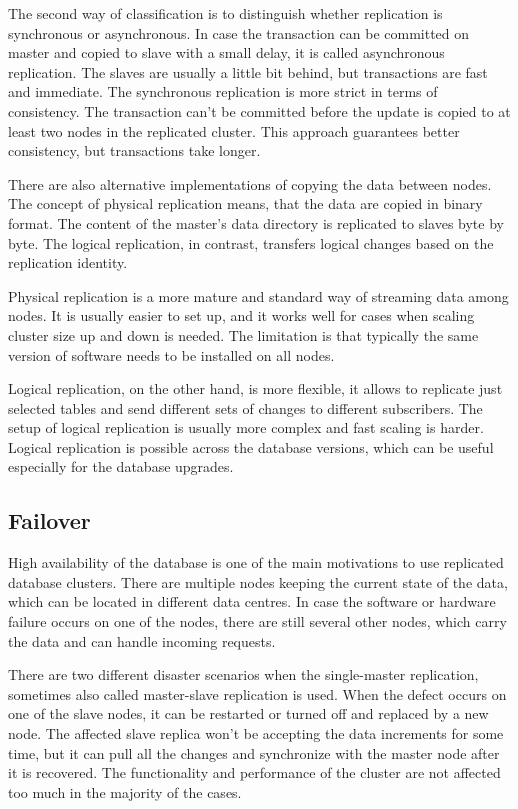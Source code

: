 \documentclass[
  digital, %
  twoside, %
  table,   %
  nolof,   %
  nolot,   %
]{fithesis3}
\begin{document}
The second way of classification is to distinguish whether replication is synchronous or asynchronous. In case the transaction can be committed on master and copied to slave with a small delay, it is called asynchronous replication. The slaves are usually a little bit behind, but transactions are fast and immediate. The synchronous replication is more strict in terms of consistency. The transaction can't be committed before the update is copied to at least two nodes in the replicated cluster. This approach guarantees better consistency, but transactions take longer.

There are also alternative implementations of copying the data between nodes. The concept of physical replication means, that the data are copied in binary format. The content of the master's data directory is replicated to slaves byte by byte. The logical replication, in contrast, transfers logical changes based on the replication identity.

Physical replication is a more mature and standard way of streaming data among nodes. It is usually easier to set up, and it works well for cases when scaling cluster size up and down is needed. The limitation is that typically the same version of software needs to be installed on all nodes.

Logical replication, on the other hand, is more flexible, it allows to replicate just selected tables and send different sets of changes to different subscribers. The setup of logical replication is usually more complex and fast scaling is harder. Logical replication is possible across the database versions, which can be useful especially for the database upgrades.

\subsection{Failover} \label{sec:failover}
High availability of the database is one of the main motivations to use replicated database clusters. There are multiple nodes keeping the current state of the data, which can be located in different data centres. In case the software or hardware failure occurs on one of the nodes, there are still several other nodes, which carry the data and can handle incoming requests.

There are two different disaster scenarios when the single-master replication, sometimes also called master-slave replication is used. When the defect occurs on one of the slave nodes, it can be restarted or turned off and replaced by a new node. The affected slave replica won't be accepting the data increments for some time, but it can pull all the changes and synchronize with the master node after it is recovered. The functionality and performance of the cluster are not affected too much in the majority of the cases.
\end{document}
